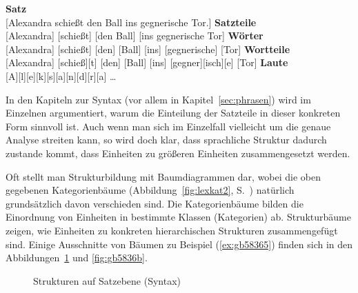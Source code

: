 \begin{exe}
  \ex\label{ex:gb58365}
  \begin{xlist}
    \ex \textbf{Satz} \\
    {[Alexandra schießt den Ball ins gegnerische Tor.]}
    \ex \textbf{Satzteile} \\
    {[Alexandra] [schießt] [den Ball] [ins gegnerische Tor]}
    \ex \textbf{Wörter} \\
    {[Alexandra] [schießt] [den] [Ball] [ins] [gegnerische] [Tor]}
    \ex \textbf{Wortteile} \\
    {[Alexandra] [schieß][t] [den] [Ball] [ins] [gegner][isch][e] [Tor]}
    \ex \textbf{Laute} \\
    {[A][l][e][k][s][a][n][d][r][a] \ldots \\}
  \end{xlist}
\end{exe}

In den Kapiteln zur Syntax (vor allem in Kapitel~\ref{sec:phrasen}) wird im Einzelnen argumentiert, warum die Einteilung der Satzteile in dieser konkreten Form sinnvoll ist.
Auch wenn man sich im Einzelfall vielleicht um die genaue Analyse streiten kann, so wird doch klar, dass sprachliche Struktur dadurch zustande kommt, dass Einheiten zu größeren Einheiten zusammengesetzt werden.


Oft stellt man Strukturbildung mit Baumdiagrammen dar, wobei die oben gegebenen Kategorienbäume (\zB Abbildung~\ref{fig:lexkat2}, S.~\pageref{fig:lexkat2}) natürlich grundsätzlich davon verschieden sind.
Die Kategorienbäume bilden die Einordnung von Einheiten in bestimmte Klassen (Kategorien) ab.
Strukturbäume zeigen, wie Einheiten zu konkreten hierarchischen Strukturen zusammengefügt sind.
Einige Ausschnitte von Bäumen zu Beispiel (\ref{ex:gb58365}) finden sich in den Abbildungen~\ref{fig:gb5836a} und \ref{fig:gb5836b}.

\begin{figure}
  \centering
  \caption{Strukturen auf Satzebene (Syntax)}
  \label{fig:gb5836a}
\end{figure}

